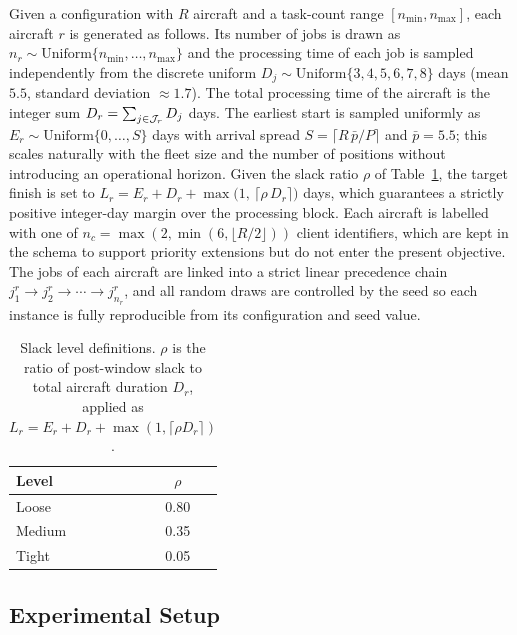 Given a configuration with $R$ aircraft and a task-count range
$[n_{\min}, n_{\max}]$, each aircraft $r$ is generated as follows.  Its
number of jobs is drawn as
$n_r \sim \mathrm{Uniform}\{n_{\min}, \ldots, n_{\max}\}$ and the
processing time of each job is sampled independently from the discrete
uniform $D_j \sim \mathrm{Uniform}\{3, 4, 5, 6, 7, 8\}$ days (mean $5.5$,
standard deviation $\approx 1.7$).  The total processing time of the
aircraft is the integer sum
$D_r = \sum_{j \in \mathcal{J}_r} D_j$ days.  The earliest start is sampled
uniformly as $E_r \sim \mathrm{Uniform}\{0, \ldots, S\}$ days with arrival
spread $S = \lceil R\,\bar p/P\rceil$ and $\bar p = 5.5$; this scales
naturally with the fleet size and the number of positions without
introducing an operational horizon.  Given the slack ratio $\rho$ of
Table~\ref{tab:slack}, the target finish is set to
$L_r = E_r + D_r + \max\!\bigl(1,\,\lceil \rho\, D_r\rceil\bigr)$ days,
which guarantees a strictly positive integer-day margin over the
processing block.  Each aircraft is labelled with one of
$n_c = \max(2, \min(6, \lfloor R/2 \rfloor))$ client identifiers, which
are kept in the schema to support priority extensions but do not enter
the present objective.  The jobs of each aircraft are linked into a
strict linear precedence chain
$j^r_1 \to j^r_2 \to \cdots \to j^r_{n_r}$, and all random draws are
controlled by the seed so each instance is fully reproducible from its
configuration and seed value.

\begin{table}[htbp]
  \centering
  \caption{Slack level definitions.  $\rho$ is the ratio of post-window
           slack to total aircraft duration $D_r$, applied as
           $L_r = E_r + D_r + \max(1, \lceil \rho D_r \rceil)$.}
  \label{tab:slack}
  \begin{tabular}{lc}
    \toprule
    Level & $\rho$ \\
    \midrule
    Loose  & 0.80 \\
    Medium & 0.35 \\
    Tight  & 0.05 \\
    \bottomrule
  \end{tabular}
\end{table}

\subsection{Experimental Setup}
\label{sec:exp_setup}

